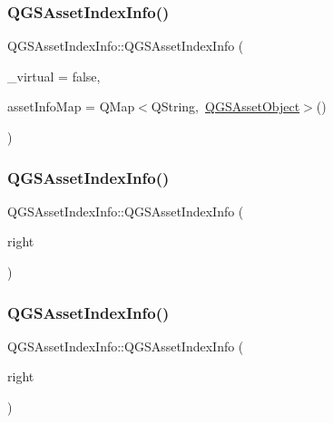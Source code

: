 \subsubsection{\texorpdfstring{Q\+G\+S\+Asset\+Index\+Info()}{QGSAssetIndexInfo()}\hspace{0.1cm}{\footnotesize\ttfamily [1/3]}}
{\footnotesize\ttfamily Q\+G\+S\+Asset\+Index\+Info\+::\+Q\+G\+S\+Asset\+Index\+Info (\begin{DoxyParamCaption}\item[{const bool}]{\+\_\+virtual = {\ttfamily false},  }\item[{const Q\+Map$<$ Q\+String, \mbox{\hyperlink{class_q_g_s_asset_object}{Q\+G\+S\+Asset\+Object}} $>$ \&}]{asset\+Info\+Map = {\ttfamily QMap$<$QString,~\mbox{\hyperlink{class_q_g_s_asset_object}{Q\+G\+S\+Asset\+Object}}$>$()} }\end{DoxyParamCaption})}

\mbox{\label{class_q_g_s_asset_index_info_aaf35334a512a447eba1bdbffa58ea485}} 
\subsubsection{\texorpdfstring{Q\+G\+S\+Asset\+Index\+Info()}{QGSAssetIndexInfo()}\hspace{0.1cm}{\footnotesize\ttfamily [2/3]}}
{\footnotesize\ttfamily Q\+G\+S\+Asset\+Index\+Info\+::\+Q\+G\+S\+Asset\+Index\+Info (\begin{DoxyParamCaption}\item[{const \mbox{\hyperlink{class_q_g_s_asset_index_info}{Q\+G\+S\+Asset\+Index\+Info}} \&}]{right }\end{DoxyParamCaption})\hspace{0.3cm}{\ttfamily [default]}}

\mbox{\label{class_q_g_s_asset_index_info_a9dd3a9731fe9d4cdde644522a5d65b55}} 
\subsubsection{\texorpdfstring{Q\+G\+S\+Asset\+Index\+Info()}{QGSAssetIndexInfo()}\hspace{0.1cm}{\footnotesize\ttfamily [3/3]}}
{\footnotesize\ttfamily Q\+G\+S\+Asset\+Index\+Info\+::\+Q\+G\+S\+Asset\+Index\+Info (\begin{DoxyParamCaption}\item[{\mbox{\hyperlink{class_q_g_s_asset_index_info}{Q\+G\+S\+Asset\+Index\+Info}} \&\&}]{right }\end{DoxyParamCaption})\hspace{0.3cm}{\ttfamily [default]}}

